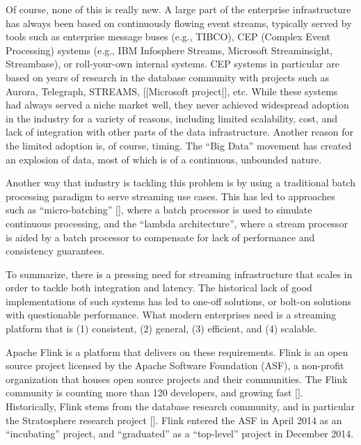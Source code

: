\documentclass{sig-alternate}
\begin{document}
Of course, none of this is really new. A large part of the enterprise infrastructure has always been based on continuously flowing event streams, typically served by tools such as enterprise message buses (e.g., TIBCO), CEP (Complex Event Processing) systems (e.g., IBM Infosphere Streams, Microsoft Streaminsight, Streambase), or roll-your-own internal systems. CEP systems in particular are based on years of research in the database community with projects such as Aurora, Telegraph, STREAMS, [[Microsoft project]], etc. While these systems had always served a niche market well, they never achieved widespread adoption in the industry for a variety of reasons, including limited scalability, cost, and lack of integration with other parts of the data infrastructure. Another reason for the limited adoption is, of course, timing. The “Big Data” movement has created an explosion of data, most of which is of a continuous, unbounded nature.

Another way that industry is tackling this problem is by using a traditional batch processing paradigm to serve streaming use cases. This has led to approaches such as “micro-batching” [], where a batch processor is used to simulate continuous processing, and the “lambda architecture”, where a stream processor is aided by a batch processor to compensate for lack of performance and consistency guarantees.

To summarize, there is a pressing need for streaming infrastructure that scales in order to tackle both integration and latency. The historical lack of good implementations of such systems has led to one-off solutions, or bolt-on solutions with questionable performance. What modern enterprises need is a streaming platform that is (1) consistent, (2) general, (3) efficient, and (4) scalable. 

Apache Flink is a platform that delivers on these requirements. Flink is an open source project licensed by the Apache Software Foundation (ASF), a non-profit organization that houses open source projects and their communities. The Flink community is counting more than 120 developers, and growing fast []. Historically, Flink stems from the database research community, and in particular the Stratosphere research project []. Flink entered the ASF in April 2014 as an “incubating” project, and “graduated” as a “top-level” project in December 2014. 
\end{document}
